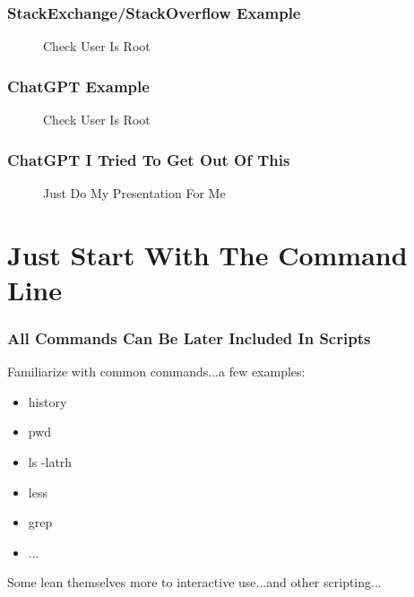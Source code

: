 \documentclass{beamer}
\begin{document}
\begin{frame}\frametitle{StackExchange/StackOverflow Example}
  \begin{figure}[!htb]
    \linewidth
    \begin{center}
    \end{center}
    \caption{Check User Is Root}\label{fig:stack-user-is-root}
  \end{figure}
\end{frame}

\begin{frame}\frametitle{ChatGPT Example}
  \begin{figure}[!htb]
    \linewidth
    \begin{center}
    \end{center}
    \caption{Check User Is Root}\label{fig:chat-user-is-root}
  \end{figure}
\end{frame}

\begin{frame}\frametitle{ChatGPT I Tried To Get Out Of This}
  \begin{figure}[!htb]
    \linewidth
    \begin{center}
    \end{center}
    \caption{Just Do My Presentation For Me}\label{fig:chat-all}
  \end{figure}
\end{frame}

\section{Just Start With The Command Line}
\begin{frame}\frametitle{All Commands Can Be Later Included In Scripts}
  Familiarize with common commands...a few examples:
  \begin{itemize}
  \item history
  \item pwd
  \item ls -latrh
  \item less
  \item grep
  \item ...
  \end{itemize}

  Some lean themselves more to interactive use...and other scripting...
\end{frame}
\end{document}
